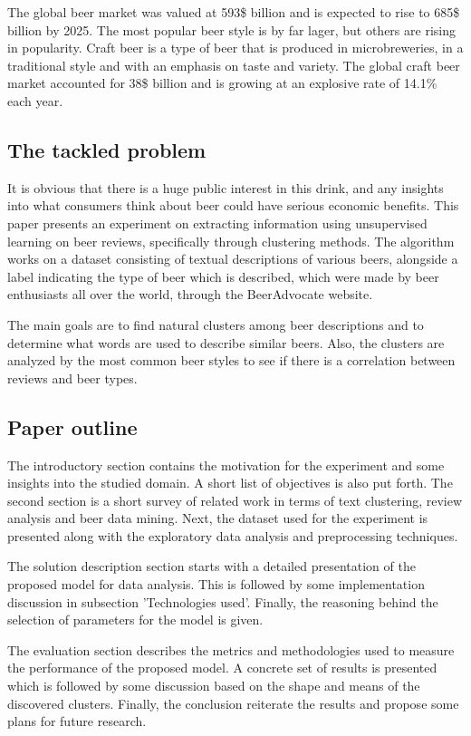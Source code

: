 \documentclass[12pt]{article}
\begin{document}
	The global beer market was valued at 593\$ billion and is expected to rise to 685\$ billion by 2025\cite{BeerStats}. The most popular beer style is by far lager, but others are rising in popularity. Craft beer is a type of beer that is produced in microbreweries, in a traditional style and with an emphasis on taste and variety. The global craft beer market accounted for 38\$ billion and is growing at an explosive rate of 14.1\% each year\cite{CraftBeerStats}.
	
	\subsection{The tackled problem}
	It is obvious that there is a huge public interest in this drink, and any insights into what consumers think about beer could have serious economic benefits. This paper presents an experiment on extracting information using unsupervised learning on beer reviews, specifically through clustering methods. The algorithm works on a dataset consisting of textual descriptions of various beers, alongside a label indicating the type of beer which is described, which were made by beer enthusiasts all over the world, through the BeerAdvocate website. 
	
	The main goals are to find natural clusters among beer descriptions and to determine what words are used to describe similar beers. Also, the clusters are analyzed by the most common beer styles to see if there is a correlation between reviews and beer types.
	
	\subsection{Paper outline}
	The introductory section contains the motivation for the experiment and some insights into the studied domain. A short list of objectives is also put forth. The second section is a short survey of related work in terms of text clustering, review analysis and beer data mining. Next, the dataset used for the experiment is presented along with the exploratory data analysis and preprocessing techniques.
	
	The solution description section starts with a detailed presentation of the proposed model for data analysis. This is followed by some implementation discussion in subsection 'Technologies used'. Finally, the reasoning behind the selection of parameters for the model is given.
	
	The evaluation section describes the metrics and methodologies used to measure the performance of the proposed model. A concrete set of results is presented which is followed by some discussion based on the shape and means of the discovered clusters. Finally, the conclusion reiterate the results and propose some plans for future research.
	
\end{document}
